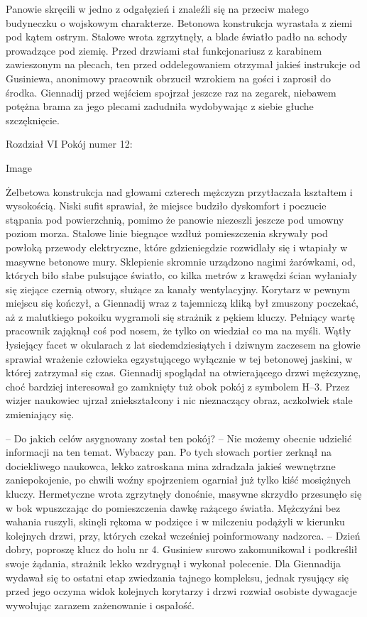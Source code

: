 \documentclass[../MAIN.tex]{subfiles}
\begin{document}
Panowie skręcili w jedno z odgałęzień i znaleźli się na przeciw małego budyneczku o wojskowym charakterze. Betonowa konstrukcja wyrastała z ziemi pod kątem ostrym. Stalowe wrota zgrzytnęły, a blade światło padło na schody prowadzące pod ziemię. Przed drzwiami stał funkcjonariusz z karabinem zawieszonym na plecach, ten przed oddelegowaniem otrzymał jakieś instrukcje od Gusiniewa, anonimowy pracownik obrzucił wzrokiem na gości i zaprosił do środka. Giennadij przed wejściem spojrzał jeszcze raz na zegarek, niebawem potężna brama za jego plecami zadudniła wydobywając z siebie głuche szczęknięcie.



Rozdział VI
Pokój numer 12:  

Image

Żelbetowa konstrukcja nad głowami czterech mężczyzn przytłaczała kształtem i wysokością. Niski sufit sprawiał, że miejsce budziło dyskomfort i poczucie stąpania pod powierzchnią, pomimo że panowie niezeszli jeszcze pod umowny poziom morza. Stalowe linie biegnące wzdłuż pomieszczenia skrywały pod powłoką przewody elektryczne, które gdzieniegdzie rozwidlały się i wtapiały w masywne betonowe mury. Sklepienie skromnie urządzono nagimi żarówkami, od, których biło słabe pulsujące światło, co kilka metrów z krawędzi ścian wyłaniały się ziejące czernią otwory, służące za kanały wentylacyjny. Korytarz w pewnym miejscu się kończył, a Giennadij wraz z tajemniczą kliką był zmuszony poczekać, aż z malutkiego pokoiku wygramoli się strażnik z pękiem kluczy. Pełniący wartę pracownik zająknął coś pod nosem, że tylko on wiedział co ma na myśli. Wątły łysiejący facet w okularach z lat siedemdziesiątych i dziwnym zaczesem na głowie sprawiał wrażenie człowieka egzystującego wyłącznie w tej betonowej jaskini, w której zatrzymał się czas. Giennadij spoglądał na otwierającego drzwi mężczyznę, choć bardziej interesował go zamknięty tuż obok pokój z symbolem H--3. Przez wizjer naukowiec ujrzał zniekształcony i nic nieznaczący obraz, aczkolwiek stale zmieniający się. 

-- Do jakich celów asygnowany został ten pokój? 
-- Nie możemy obecnie udzielić informacji na ten temat. Wybaczy pan. 
Po tych słowach portier zerknął na dociekliwego naukowca, lekko zatroskana mina zdradzała jakieś wewnętrzne zaniepokojenie, po chwili woźny spojrzeniem ogarniał już tylko kiść mosiężnych kluczy. Hermetyczne wrota zgrzytnęły donośnie, masywne skrzydło przesunęło się w bok wpuszczając do pomieszczenia dawkę rażącego światła. Mężczyźni bez wahania ruszyli, skinęli rękoma w podzięce i w milczeniu podążyli w kierunku kolejnych drzwi, przy, których czekał wcześniej poinformowany nadzorca. 
-- Dzień dobry, poproszę klucz do holu nr 4. 
Gusiniew surowo zakomunikował i podkreślił swoje żądania, strażnik lekko wzdrygnął i wykonał polecenie. Dla Giennadija wydawał się to ostatni etap zwiedzania tajnego kompleksu, jednak rysujący się przed jego oczyma widok kolejnych korytarzy i drzwi rozwiał osobiste dywagacje wywołując zarazem zażenowanie i ospałość. 
\end{document}

